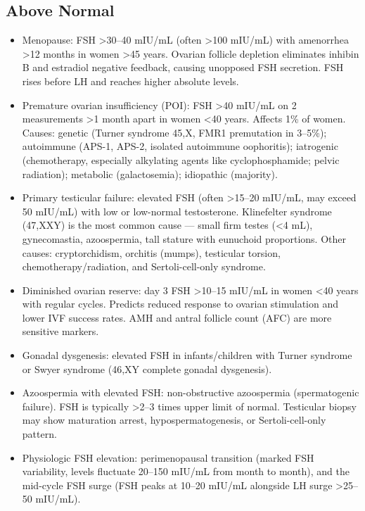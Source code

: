 \subsection*{Above Normal}
\begin{itemize}
  \item Menopause: FSH >30--40 mIU/mL (often >100 mIU/mL) with amenorrhea >12 months in women >45 years. Ovarian follicle depletion eliminates inhibin B and estradiol negative feedback, causing unopposed FSH secretion. FSH rises before LH and reaches higher absolute levels.
  \item Premature ovarian insufficiency (POI): FSH >40 mIU/mL on 2 measurements >1 month apart in women <40 years. Affects 1\% of women. Causes: genetic (Turner syndrome 45,X, FMR1 premutation in 3--5\%); autoimmune (APS-1, APS-2, isolated autoimmune oophoritis); iatrogenic (chemotherapy, especially alkylating agents like cyclophosphamide; pelvic radiation); metabolic (galactosemia); idiopathic (majority).
  \item Primary testicular failure: elevated FSH (often >15--20 mIU/mL, may exceed 50 mIU/mL) with low or low-normal testosterone. Klinefelter syndrome (47,XXY) is the most common cause --- small firm testes (<4 mL), gynecomastia, azoospermia, tall stature with eunuchoid proportions. Other causes: cryptorchidism, orchitis (mumps), testicular torsion, chemotherapy/radiation, and Sertoli-cell-only syndrome.
  \item Diminished ovarian reserve: day 3 FSH >10--15 mIU/mL in women <40 years with regular cycles. Predicts reduced response to ovarian stimulation and lower IVF success rates. AMH and antral follicle count (AFC) are more sensitive markers.
  \item Gonadal dysgenesis: elevated FSH in infants/children with Turner syndrome or Swyer syndrome (46,XY complete gonadal dysgenesis).
  \item Azoospermia with elevated FSH: non-obstructive azoospermia (spermatogenic failure). FSH is typically >2--3 times upper limit of normal. Testicular biopsy may show maturation arrest, hypospermatogenesis, or Sertoli-cell-only pattern.
  \item Physiologic FSH elevation: perimenopausal transition (marked FSH variability, levels fluctuate 20--150 mIU/mL from month to month), and the mid-cycle FSH surge (FSH peaks at 10--20 mIU/mL alongside LH surge >25--50 mIU/mL).
\end{itemize}

